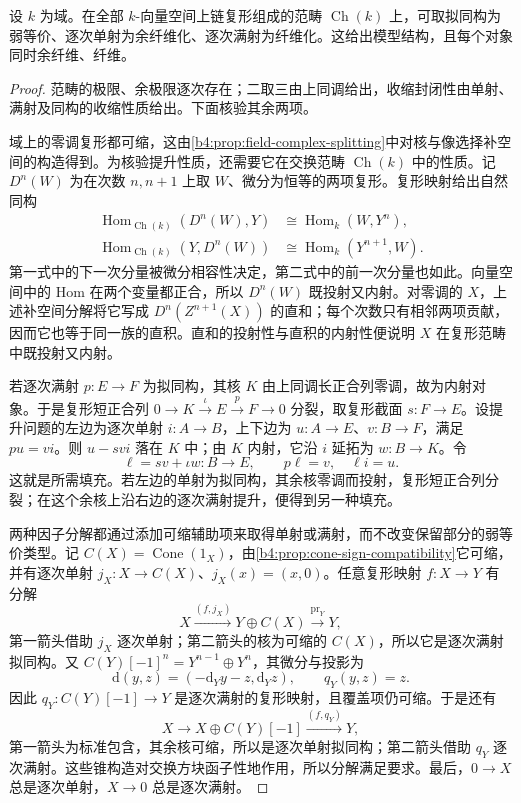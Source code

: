 \begin{example}\label{b4:exm:B-field-complex-model}
	设 \(k\) 为域。在全部 \(k\)-向量空间上链复形组成的范畴 \(\operatorname{Ch}(k)\) 上，可取拟同构为弱等价、逐次单射为余纤维化、逐次满射为纤维化。这给出模型结构，且每个对象同时余纤维、纤维。
\end{example}
\begin{proof}
	范畴的极限、余极限逐次存在；二取三由上同调给出，收缩封闭性由单射、满射及同构的收缩性质给出。下面核验其余两项。

	域上的零调复形都可缩，这由\cref{b4:prop:field-complex-splitting}中对核与像选择补空间的构造得到。为核验提升性质，还需要它在交换范畴 \(\operatorname{Ch}(k)\) 中的性质。记 \(D^n(W)\) 为在次数 \(n,n+1\) 上取 \(W\)、微分为恒等的两项复形。复形映射给出自然同构
	\[
		\begin{aligned}
			\operatorname{Hom}_{\operatorname{Ch}(k)}(D^n(W),Y) &\cong\operatorname{Hom}_k(W,Y^n),\\
			\operatorname{Hom}_{\operatorname{Ch}(k)}(Y,D^n(W)) &\cong\operatorname{Hom}_k(Y^{n+1},W).
		\end{aligned}
	\]
	第一式中的下一次分量被微分相容性决定，第二式中的前一次分量也如此。向量空间中的 Hom 在两个变量都正合，所以 \(D^n(W)\) 既投射又内射。对零调的 \(X\)，上述补空间分解将它写成 \(D^n(Z^{n+1}(X))\) 的直和；每个次数只有相邻两项贡献，因而它也等于同一族的直积。直和的投射性与直积的内射性便说明 \(X\) 在复形范畴中既投射又内射。

	若逐次满射 \(p:E\rightarrow F\) 为拟同构，其核 \(K\) 由上同调长正合列零调，故为内射对象。于是复形短正合列 \(0\to K\xrightarrow{\iota}E\xrightarrow{p}F\to0\) 分裂，取复形截面 \(s:F\to E\)。设提升问题的左边为逐次单射 \(i:A\to B\)，上下边为 \(u:A\to E\)、\(v:B\to F\)，满足 \(pu=vi\)。则 \(u-svi\) 落在 \(K\) 中；由 \(K\) 内射，它沿 \(i\) 延拓为 \(w:B\to K\)。令
	\[
		\ell=sv+\iota w:B\longrightarrow E, \qquad p\ell=v,\quad \ell i=u.
	\]
	这就是所需填充。若左边的单射为拟同构，其余核零调而投射，复形短正合列分裂；在这个余核上沿右边的逐次满射提升，便得到另一种填充。

	两种因子分解都通过添加可缩辅助项来取得单射或满射，而不改变保留部分的弱等价类型。记 \(C(X)=\operatorname{Cone}(1_X)\)，由\cref{b4:prop:cone-sign-compatibility}它可缩，并有逐次单射 \(j_X:X\rightarrow C(X)\)、\(j_X(x)=(x,0)\)。任意复形映射 \(f:X\rightarrow Y\) 有分解
	\[
		X\xrightarrow{(f,j_X)}Y\oplus C(X)\xrightarrow{\mathrm{pr}_Y}Y,
	\]
	第一箭头借助 \(j_X\) 逐次单射；第二箭头的核为可缩的 \(C(X)\)，所以它是逐次满射拟同构。又 \(C(Y)[-1]^n=Y^{n-1}\oplus Y^n\)，其微分与投影为
	\[
		\mathrm d(y,z)=(-\mathrm d_Yy-z,\mathrm d_Yz), \qquad q_Y(y,z)=z.
	\]
	因此 \(q_Y:C(Y)[-1]\to Y\) 是逐次满射的复形映射，且覆盖项仍可缩。于是还有
	\[
		X\longrightarrow X\oplus C(Y)[-1] \xrightarrow{(f,q_Y)}Y,
	\]
	第一箭头为标准包含，其余核可缩，所以是逐次单射拟同构；第二箭头借助 \(q_Y\) 逐次满射。这些锥构造对交换方块函子性地作用，所以分解满足要求。最后，\(0\rightarrow X\) 总是逐次单射，\(X\rightarrow0\) 总是逐次满射。
\end{proof}

